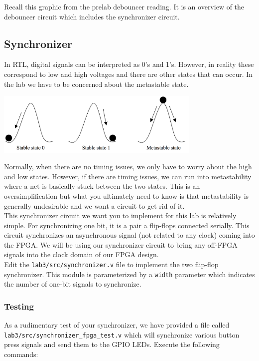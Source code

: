 \documentclass[11pt]{article}
\begin{document}
Recall this graphic from the prelab debouncer reading. It is an overview of the debouncer circuit which includes the synchronizer circuit.

\subsection{Synchronizer}
In RTL, digital signals can be interpreted as 0's and 1's. However, in reality these correspond to low and high voltages and there are other states that can occur. In the lab we have to be concerned about the metastable state.

\begin{center}
\includegraphics[height=3cm]{images/lab2_fig3.png}
\end{center}

Normally, when there are no timing issues, we only have to worry about the high and low states. However, if there are timing issues, we can run into metastability where a net is basically stuck between the two states. This is an oversimplification but what you ultimately need to know is that metastability is generally undesirable and we want a circuit to get rid of it. \\

This synchronizer circuit we want you to implement for this lab is relatively simple. For synchronizing one bit, it is a pair a flip-flops connected serially. This circuit synchronizes an asynchronous signal (not related to any clock) coming into the FPGA. We will be using our synchronizer circuit to bring any off-FPGA signals into the clock domain of our FPGA design.\\

Edit the \verb|lab3/src/synchronizer.v| file to implement the two flip-flop synchronizer. This module is parameterized by a \verb|width| parameter which indicates the number of one-bit signals to synchronize.

\subsubsection{Testing}
As a rudimentary test of your synchronizer, we have provided a file called \verb|lab3/src/synchronizer_fpga_test.v| which will synchronize various button press signals and send them to the GPIO LEDs. Execute the following commands:
\end{document}
